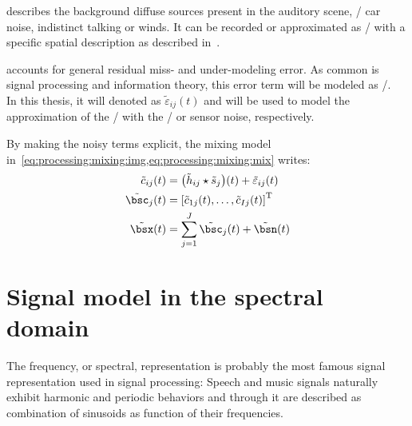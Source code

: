  describes the background diffuse sources present in the auditory scene, \eg/ car noise, indistinct talking or winds.
It can be recorded or approximated as \AWGN/ with a specific spatial description as described in~.

 accounts for general residual miss- and under-modeling error.
As common is signal processing and information theory, this error term will be modeled as \AWGN/.
\\In this thesis, it will denoted as $\tilde{\varepsilon}_{ij}( t)$ and will be used to model the
approximation of the \RIR/ with the \ISM/ or sensor noise, respectively.

\mynewline
By making the noisy terms explicit, the mixing model in~\cref{eq:processing:mixing:img,eq:processing:mixing:mix} writes:
\begin{align}
    \tilde{\img}_{\idxMic\idxSrc}(t) &=  \kparen{\tilde{\rir}_{\idxMic\idxSrc} \convCont \tilde{\src}_\idxSrc} (t) +  \tilde{\varepsilon}_{ij}(t)\\
    \tilde{\imgs}_\idxSrc(t)         &= \ktranspose{\klist{\tilde{\img}_{1\idxSrc}(t), \dots, \tilde{\img}_{\numMics\idxSrc}(t)}} \nonumber\\
    \tilde{\mics}(t)                 &= \sum_{\idxSrc=1}^{\numSrcs} \tilde{\imgs}_\idxSrc(t) + \tilde{\bsn}( t)
\end{align}

\section{Signal model in the spectral domain}\label{sec:processing:domains}%
The frequency, or spectral, representation is probably the most famous signal representation used in signal processing:
Speech and music signals naturally exhibit harmonic and periodic behaviors and
through it are described as combination of sinusoids as function of their frequencies.


